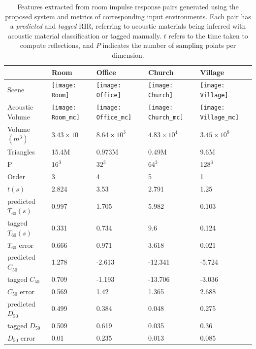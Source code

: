 \begin{table}
  \caption{Features extracted from room impulse response pairs generated using the proposed system and metrics of corresponding input environments. Each pair has a \emph{predicted} and \emph{tagged} RIR, referring to acoustic materials being inferred with acoustic material classification or tagged manually. $t$ refers to the time taken to compute reflections, and $P$ indicates the number of sampling points per dimension.}
  \label{tab:ism_scene_scores}
	\centering%
\begin{tabular}{lllll}
                         & Room             & Office            & Church         & Village        \\ \midrule
Scene                    & \texttt{[image: Room]}  & \texttt{[image: Office]} & \texttt{[image: Church]} & \texttt{[image: Village]} \\
Acoustic Volume          & \texttt{[image: Room\_mc]}  & \texttt{[image: Office\_mc]} & \texttt{[image: Church\_mc]} & \texttt{[image: Village\_mc]} \\ \midrule
Volume $(m^3)$           & $3.43 \times 10$      & $8.64 \times 10^3$     & $4.83 \times 10^4$  & $3.45 \times 10^8$  \\
Triangles                & 15.4M            & 0.973M            & 0.49M          & 9.6M           \\
P                        & $16^3$           & $32^3$            & $64^3$         & $128^3$        \\
Order                    & 3                & 4                 & 5              & 1              \\
$t (s) $                 & 2.824            & 3.53              & 2.791          & 1.25           \\ \midrule
predicted $T_{60} (s)$   & 0.997            & 1.705             & 5.982          & 0.103          \\
tagged $T_{60}(s)$       & 0.331            & 0.734             & 9.6            & 0.124          \\
$T_{60}$ error           & 0.666            & 0.971             & 3.618          & 0.021          \\ \midrule
predicted $C_{50}$       & 1.278            & -2.613            & -12.341        & -5.724         \\
tagged $C_{50}$          & 0.709            & -1.193            & -13.706        & -3.036         \\
$C_{50}$ error           & 0.569            & 1.42              & 1.365          & 2.688          \\ \midrule
predicted $D_{50}$       & 0.499            & 0.384             & 0.048          & 0.275          \\
tagged $D_{50}$          & 0.509            & 0.619             & 0.035          & 0.36          \\
$D_{50}$ error           & 0.01             & 0.235             & 0.013           & 0.085          \\
\end{tabular}%
\end{table}

